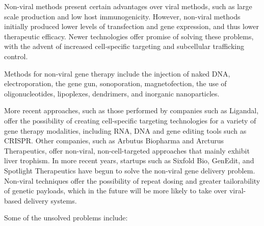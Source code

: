 Non-viral methods present certain advantages over viral methods, such as large scale production and low host immunogenicity. However, non-viral methods initially produced lower levels of transfection and gene expression, and thus lower therapeutic efficacy. Newer technologies offer promise of solving these problems, with the advent of increased cell-specific targeting and subcellular trafficking control.

Methods for non-viral gene therapy include the injection of naked DNA, electroporation, the gene gun, sonoporation, magnetofection, the use of oligonucleotides, lipoplexes, dendrimers, and inorganic nanoparticles.

More recent approaches, such as those performed by companies such as Ligandal, offer the possibility of creating cell-specific targeting technologies for a variety of gene therapy modalities, including RNA, DNA and gene editing tools such as CRISPR. Other companies, such as Arbutus Biopharma and Arcturus Therapeutics, offer non-viral, non-cell-targeted approaches that mainly exhibit liver trophism. In more recent years, startups such as Sixfold Bio, GenEdit, and Spotlight Therapeutics have begun to solve the non-viral gene delivery problem. Non-viral techniques offer the possibility of repeat dosing and greater tailorability of genetic payloads, which in the future will be more likely to take over viral-based delivery systems.

Some of the unsolved problems include:

